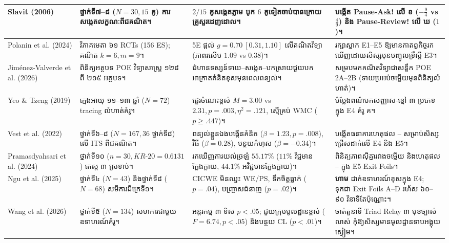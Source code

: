 \documentclass[a4paper,12pt]{article}
\newcommand{\en}[1]{{\TimesEn #1}}
\newcommand{\cnum}[1]{{\fontsize{11pt}{13pt}\selectfont\ding{\numexpr181+#1\relax}}\hspace{0.15em}}
\begin{document}
{\begin{longtable}{|L{2.30cm}|L{4.55cm}|L{5.10cm}|L{4.90cm}|}
\hline
\en{[08] Slavit (2006)} & ថ្នាក់ទី៧--៨ ($N=30, 15$ គូ) ការសង្កេតលក្ខណៈពីជគណិត។ & $2/15$ គូសង្កេតភ្លាម បូក $6$ គូទៀតចាប់បានក្រោយគ្រូសួរដេញដោល។ & បង្កើត \en{Pause-Ask!} លើ ខ ($-\frac{9}{4}$ \en{vs} $\frac{4}{9}$) និង \en{Pause-Review!} លើ ឃ ($1$)។ \\
\hline
\en{[09] Polanin et al. (2024)} & វិភាគមេតា ៦១ \en{RCTs (156 ES)}; គណិត $k=6, m=9$។ & \en{5E} ផ្តល់ $g=0.70\ [0.31, 1.10]$ លើគណិតវិទ្យា (ភាពរសើប $1.09$ \en{vs} $0.38$)។ & រក្សាស្លាក \en{E1--E5} ឱ្យមានកាតព្វកិច្ចរកឃើញដោយសិស្សមុនបញ្ចូលទ្រឹស្ដី \en{E3}។ \\
\hline
\en{[10] Jim\'enez-Valverde et al. (2026)} & ពិនិត្យអត្ថបទ \en{POE} វិទ្យាសាស្ត្រ ១២៨ ពី ២១៥ អត្ថបទ។ & ជំហានទស្សន៍ទាយ--សង្កេត--បកស្រាយជួយបកអាក្រាតគំនិតខុសមុនពេលពន្យល់។ & សម្របមកគណិតវិទ្យាជាសន្លឹក \en{POE 2A--2B} (ទាយប្រអប់ចម្លើយមុនពិនិត្យលំហាត់)។ \\
\hline
\en{[11] Yeo \& Tzeng (2019)} & ក្មេងអាយុ ១១--១៣ ឆ្នាំ ($N=72$) \en{tracing} លំហាត់គំរូ។ & ផ្ទេរចំណេះខ្ពស់ $M=3.00$ \en{vs} $2.31, p=.003, \eta^2=.121$, ស្មើគ្រប់ \en{WMC} ($p\ge .447$)។ & បំប្លែងពណ៌មកសញ្ញាស-ខ្មៅ \en{[tracing]} ៣ ប្រភេទក្នុង \en{E4} គំរូ គ។ \\
\hline
\en{[12] Vest et al. (2022)} & ថ្នាក់ទី៦--៨ ($N=167, 36$ ថ្នាក់ទី៨) លើ \en{ITS} ពីជគណិត។ & ពន្យល់ខ្លួនឯងបង្កើនគំនិត ($\beta=1.23, p=.008$), វិធី ($\beta=0.28$), បន្ថយកំហុស ($\beta=-0.34$)។ & បង្កើតធនាគារហេតុផល \cnum{1}--\cnum{5} សម្រាប់សិស្សជ្រើសដាក់លើ \en{E4} និង \en{E5}។ \\
\hline
\en{[13] Pramasdyahsari et al. (2024)} & ថ្នាក់ទី១០ ($n=30, KR\text{-}20=0.6131$) តេស្ត ៣ ស្រទាប់។ & រកឃើញការយល់ច្រឡំ $55.17\%$ ($11\%$ វិជ្ជមានក្លែងក្លាយ, $44.1\%$ អវិជ្ជមានក្លែងក្លាយ)។ & ពិនិត្យភាពស៊ីគ្នារវាងចម្លើយ និងហេតុផល \cnum{1}--\cnum{5} ក្នុង \en{E5 Exit Foils}។ \\
\hline
\en{[14] Ngu et al. (2025)} & ថ្នាក់ទី៤ ($N=43$) និងថ្នាក់ទី៨ ($N=68$) សមីការដឺក្រេទី១។ & \en{CICWE} មិនឈ្នះ \en{WE/PS}, ទឹកចិត្តធ្លាក់ ($p=.04$), បញ្ច្រាសជំនាញ ($p=.02$)។ & \textbf{ហាម} ដាក់ឧទាហរណ៍ខុសក្នុង \en{E4}; ទុកជា \en{Exit Foils A--D} រហ័ស ៦០--៩០ វិនាទីតែប៉ុណ្ណោះ។ \\
\hline
\en{[15] Wang et al. (2026)} & ថ្នាក់ទី៥ ($N=134$) សហការជាមួយឧទាហរណ៍គំរូ។ & អន្តរកម្ម ៣ ទិស $p<.05$; ជួយក្រុមមូលដ្ឋានខ្ពស់ ($F=6.74, p<.05$) និងបន្ថយ \en{CL} ($p<.01$)។ & ចាត់តួនាទី \en{Triad Relay} ៣ មុខច្បាស់លាស់ កុំឱ្យសិស្សមានមូលដ្ឋានទាបអង្គុយស្ងៀម។ \\
\hline
\end{longtable}}
\end{document}
